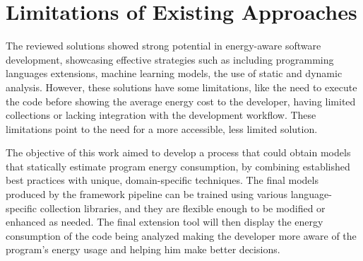 \section{Limitations of Existing Approaches}

The reviewed solutions showed strong potential in energy-aware software development, showcasing effective strategies such as including programming languages extensions, machine learning models, the use of static and dynamic analysis. However, these solutions have some limitations, like the need to execute the code before showing the average energy cost to the developer, having limited collections or lacking integration with the development workflow. These limitations point to the need for a more accessible, less limited solution.

The objective of this work aimed to develop a process that could obtain models that statically estimate program energy consumption, by combining established best practices with unique, domain-specific techniques. The final models produced by the framework pipeline can be trained using various language-specific collection libraries, and they are flexible enough to be modified or enhanced as needed. The final extension tool will then display the energy consumption of the code being analyzed making the developer more aware of the program's energy usage and helping him make better decisions.
